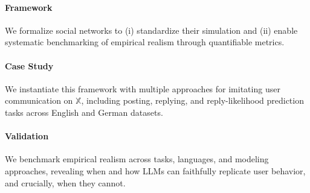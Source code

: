 \paragraph{Framework}
We formalize social networks to (i) standardize their simulation and (ii) enable systematic benchmarking of empirical realism through quantifiable metrics.

\paragraph{Case Study}
We instantiate this framework with multiple approaches for imitating user communication on $\mathbb{X}$, including posting, replying, and reply-likelihood prediction tasks across English and German datasets.

\paragraph{Validation}
We benchmark empirical realism across tasks, languages, and modeling approaches, revealing when and how LLMs can faithfully replicate user behavior, and crucially, when they cannot.


